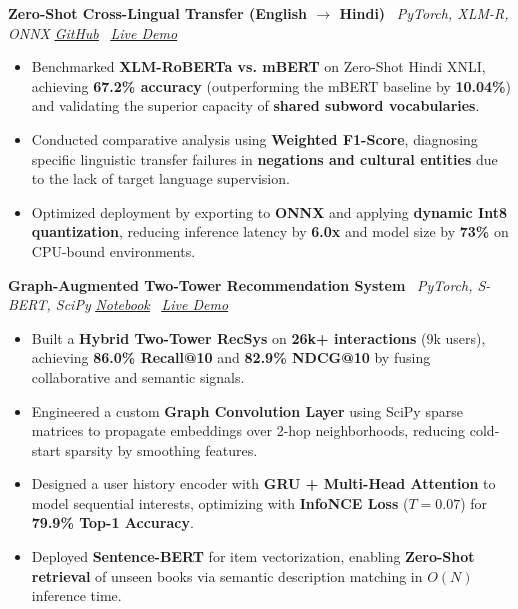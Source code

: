 \documentclass[a4paper,10pt]{article}
\newcommand{\ulhref}[2]{\href{#1}{\uline{#2}}}
\begin{document}
\textbf{Zero-Shot Cross-Lingual Transfer (English $\rightarrow$ Hindi)} \textbar\ \textit{PyTorch, XLM-R, ONNX} \hfill \textit{\ulhref{https://github.com/PunVas/cross-lingual-transfer-indic}{GitHub}} \textbar\ \textit{\ulhref{https://huggingface.co/spaces/puneet0609/hindi-nli-demo}{Live Demo}}
\begin{itemize}
    \item Benchmarked \textbf{XLM-RoBERTa vs. mBERT} on Zero-Shot Hindi XNLI, achieving \textbf{67.2\% accuracy} (outperforming the mBERT baseline by \textbf{10.04\%}) and validating the superior capacity of \textbf{shared subword vocabularies}.
    \item Conducted comparative analysis using \textbf{Weighted F1-Score}, diagnosing specific linguistic transfer failures in \textbf{negations and cultural entities} due to the lack of target language supervision.
    \item Optimized deployment by exporting to \textbf{ONNX} and applying \textbf{dynamic Int8 quantization}, reducing inference latency by \textbf{6.0x} and model size by \textbf{73\%} on CPU-bound environments.
\end{itemize}

\textbf{Graph-Augmented Two-Tower Recommendation System} \textbar\ \textit{PyTorch, S-BERT, SciPy}
\hfill \textit{\ulhref{https://colab.research.google.com/drive/1pSZ-_kfBuV2U72o1rum27Nb86zPyZxHq?usp=sharing}{Notebook}} \textbar\ \textit{\ulhref{https://huggingface.co/spaces/puneet0609/book-recommender-graphnn-2twr}{Live Demo}}
\begin{itemize}
    \item Built a \textbf{Hybrid Two-Tower RecSys} on \textbf{26k+ interactions} (9k users), achieving \textbf{86.0\% Recall@10} and \textbf{82.9\% NDCG@10} by fusing collaborative and semantic signals.
    \item Engineered a custom \textbf{Graph Convolution Layer} using SciPy sparse matrices to propagate embeddings over 2-hop neighborhoods, reducing cold-start sparsity by smoothing features.
    \item Designed a user history encoder with \textbf{GRU + Multi-Head Attention} to model sequential interests, optimizing with \textbf{InfoNCE Loss} ($T=0.07$) for \textbf{79.9\% Top-1 Accuracy}.
    \item Deployed \textbf{Sentence-BERT} for item vectorization, enabling \textbf{Zero-Shot retrieval} of unseen books via semantic description matching in $O(N)$ inference time.
\end{itemize}
\end{document}
